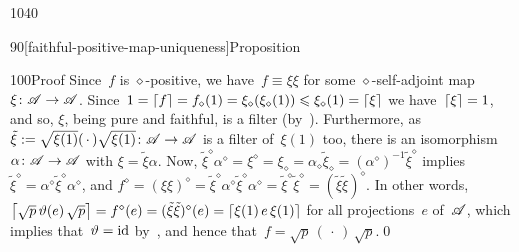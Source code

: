 \begin{parsec}{1040}
\begin{point}{90}[faithful-positive-map-uniqueness]{Proposition}
\begin{point}{100}{Proof}
Since~$f$ is $\diamond$-positive,
we have~$f\equiv \xi \xi$ for some $\diamond$-self-adjoint
map~$\xi\colon \mathscr{A}\to\mathscr{A}$.
Since~$1=\left\lceil f\right\rceil=f_\diamond(1)=
\xi_\diamond(\xi_\diamond(1))\leqslant \xi_\diamond(1)=\left\lceil\xi\right\rceil$
we have~$\left\lceil\xi\right\rceil=1$,
and so, $\xi$, being pure and faithful,
is a filter (by~).
Furthermore,
as~$\tilde\xi:=\sqrt{\xi(1)}(\,\cdot\,)\sqrt{\xi(1)}\colon \mathscr{A}\to\mathscr{A}$
is a filter of~$\xi(1)$ too,
there is an isomorphism~$\alpha\colon \mathscr{A}\to\mathscr{A}$
with $\xi=\tilde\xi\alpha$.
Now, $ {\tilde\xi}^\diamond \alpha^\diamond
={\xi}^\diamond={\xi}_\diamond
=\alpha_\diamond\tilde \xi_\diamond
= (\alpha^\diamond)^{-1}{\tilde\xi}^\diamond$
implies~${\tilde\xi}^\diamond = \alpha^\diamond 
{\tilde \xi}^\diamond \alpha^\diamond$,
and 
$f^\diamond= (\xi\xi)^\diamond
= {\tilde \xi}^\diamond\alpha^\diamond{\tilde \xi}^\diamond\alpha^\diamond
={\tilde \xi}^\diamond{\tilde \xi}^\diamond=(\tilde \xi\tilde \xi)^\diamond$.
In other words,
$\left\lceil\sqrt{p}\,\vartheta(e)\,\sqrt{p}\right\rceil
=f^\diamond(e)=(\tilde\xi\tilde\xi)^\diamond(e)
= \left\lceil\xi(1)\,e\,\xi(1)\right\rceil$
for all projections~$e$ of~$\mathscr{A}$,
which implies that~$\vartheta=\mathrm{id}$
by~,
and hence that~$f=\sqrt{p}\,(\,\cdot\,)\,\sqrt{p}$.\qed
\end{point}
\end{point}
\end{parsec}
